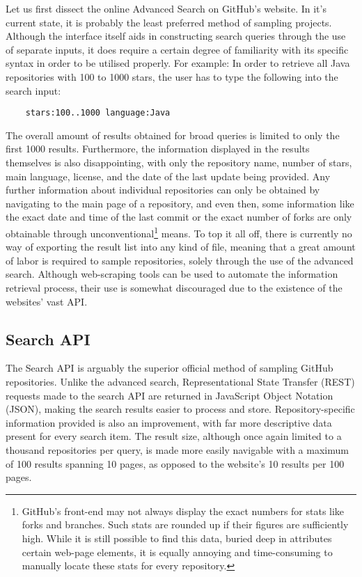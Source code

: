 Let us first dissect the online Advanced Search on GitHub's website.
In it's current state, it is probably the least preferred method of sampling projects.
Although the interface itself aids in constructing search queries through the use of separate inputs, it does require a certain degree of familiarity with its specific syntax in order to be utilised properly.
For example: In order to retrieve all Java repositories with 100 to 1000 stars, the user has to type the following into the search input:
\begin{verbatim}
    stars:100..1000 language:Java
\end{verbatim}
The overall amount of results obtained for broad queries is limited to only the first 1000 results.
Furthermore, the information displayed in the results themselves is also disappointing, with only the repository name, number of stars, main language, license, and the date of the last update being provided.
Any further information about individual repositories can only be obtained by navigating to the main page of a repository, and even then, some information like the exact date and time of the last commit or the exact number of forks are only obtainable through unconventional\footnote{GitHub's front-end may not always display the exact numbers for stats like forks and branches.
Such stats are rounded up if their figures are sufficiently high.
While it is still possible to find this data, buried deep in attributes certain web-page elements, it is equally annoying and time-consuming to manually locate these stats for every repository.} means.
To top it all off, there is currently no way of exporting the result list into any kind of file, meaning that a great amount of labor is required to sample repositories, solely through the use of the advanced search.
Although web-scraping tools can be used to automate the information retrieval process, their use is somewhat discouraged due to the existence of the websites' vast API\@.

\newpage
\subsection{Search API}

The Search API is arguably the superior official method of sampling GitHub repositories.
Unlike the advanced search, Representational State Transfer (REST) requests made to the search API are returned in JavaScript Object Notation (JSON), making the search results easier to process and store.
Repository-specific information provided is also an improvement, with far more descriptive data present for every search item.
The result size, although once again limited to a thousand repositories per query, is made more easily navigable with a maximum of 100 results spanning 10 pages, as opposed to the website's 10 results per 100 pages.

